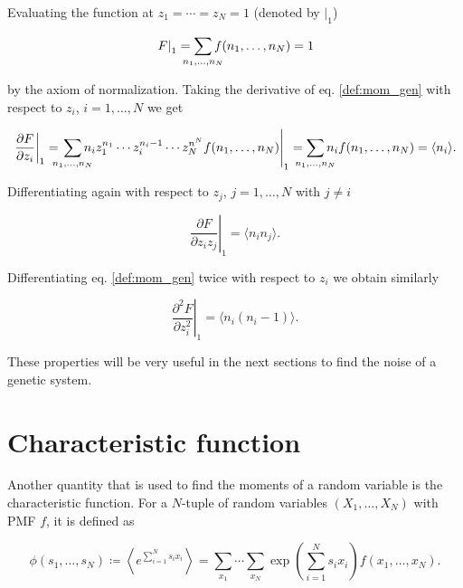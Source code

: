 Evaluating the function at $z_1 = \dotsb = z_N = 1$ (denoted by $\left. \right|_1$)

\begin{equation*}
  \left.F\right|_1 = \sum_{\mathclap{n_1,\dotsc,n_N}}f(n_1,\dotsc,n_N) = 1
\end{equation*}

by the axiom of normalization. Taking the derivative of eq. \eqref{def:mom_gen} with respect to $z_i$, $i = 1,\dotsc,N$ we get

\begin{equation*}
  \left.\frac{\partial F}{\partial z_i}\right|_1 = \left.\sum_{\mathclap{n_1,\dotsc,n_N}}n_i z_1^{n_1}\dotsm z_i^{n_i-1}\dotsm z_N^{n^N}f(n_1,\dotsc,n_N)\right|_1 = \sum_{\mathclap{n_1,\dotsc,n_N}} n_i f(n_1,\dotsc,n_N) = \langle n_i \rangle.
\end{equation*}

Differentiating again with respect to $z_j$, $j=1,\dotsc,N$ with $j\neq i$

\begin{equation*}
  \left. \frac{\partial F}{\partial z_i z_j} \right|_1 = \langle n_i n_j \rangle.
\end{equation*}

Differentiating eq. \eqref{def:mom_gen} twice with respect to $z_i$ we obtain similarly

\begin{equation*}
  \left. \frac{\partial^2F}{\partial z_i^2}\right|_1 = \langle n_i(n_i-1) \rangle.
\end{equation*}

These properties will be very useful in the next sections to find the noise of a genetic system.

\section{Characteristic function}
\label{sec:con-charac_func}
Another quantity that is used to find the moments of a random variable is the characteristic function. For a $N$-tuple of random variables $(X_1,\dotsc,X_N)$ with PMF $f$, it is defined as

\begin{equation*}
  \phi(s_1,\dotsc,s_N)\coloneqq \left\langle e^{\sum_{i=1}^Ns_ix_i}\right\rangle = \sum_{x_1}\dotsi\sum_{x_N}\exp\left(\sum_{i=1}^Ns_ix_i\right)f(x_1,\dotsc,x_N).
\end{equation*}

